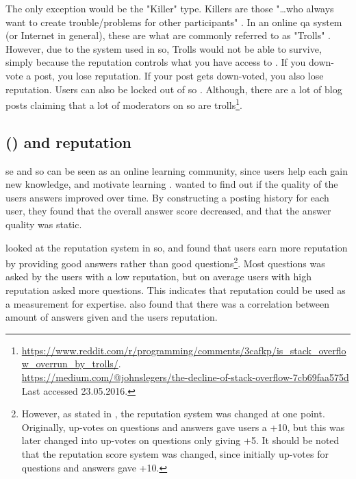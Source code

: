 The only exception would be the "Killer" type. 
Killers are those "\ldots who always want to create trouble/problems for other participants" \cite[p.~3]{Maan2013}. 
In an online \gls{qa} system (or Internet in general), these are what are commonly referred to as "Trolls" \cite{Fosdick2012, Atwood2015}. 
However, due to the system used in \gls{so}, Trolls would not be able to survive, simply because the reputation controls what you have access to \cite{StackOverflow.com2016g}. 
If you down-vote a post, you lose reputation. 
If your post gets down-voted, you also lose reputation. 
Users can also be locked out of \gls{so} \cite{Atwood2009}.
Although, there are a lot of blog posts claiming that a lot of moderators on \gls{so} are 
trolls\footnote{\url{https://www.reddit.com/r/programming/comments/3cafkp/is_stack_overflow_overrun_by_trolls/}. \\	
	\url{https://medium.com/@johnslegers/the-decline-of-stack-overflow-7cb69faa575d} \\ 
	Last accessed 23.05.2016. 
}.

\subsection[Stack Overflow and reputation]{ () and reputation}
\label{sec:research_on_so}


\gls{se} and \gls{so} can be seen as an online learning community, since users help each gain new knowledge, and motivate learning \cite{Posnett2012}. 
\textcite{Posnett2012} wanted to find out if the quality of the users answers improved over time. 
By constructing a posting history for each user, they found that the overall answer score decreased, and that the answer quality was static.


\textcite{Movshovitz-Attias2013} looked at the reputation system in \gls{so}, and found that users earn more reputation by providing good answers rather than good 
questions\footnote{
	However, as stated in \textcite[p.~3]{Movshovitz-Attias2013}, the reputation system was changed at one point. 
	Originally, up-votes on questions and answers gave users a +10, but this was later changed into up-votes on questions only giving +5. 
	It should be noted that the reputation score system was changed, since initially up-votes for questions and answers gave +10.
	}.
Most questions was asked by the users with a low reputation, but on average users with high reputation asked more questions. 
This indicates that reputation could be used as a measurement for expertise. 
\textcite{Ahmed2015} also found that there was a correlation between amount of answers given and the users reputation.


